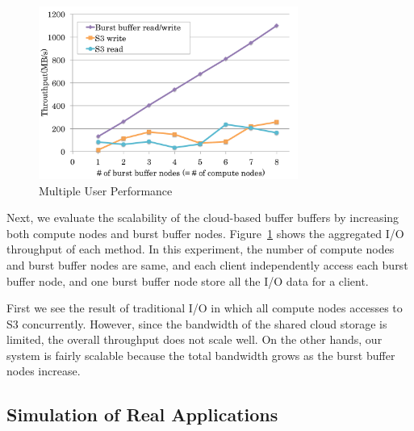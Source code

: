 \begin{figure}
\centering
\includegraphics[width=8.5cm]{img/multiple_client-2.pdf}
\caption{Multiple User Performance}
\label{evaluation:multiple user performance}
\end{figure}
Next, we evaluate the scalability of the
cloud-based buffer buffers by increasing both compute nodes and burst
buffer nodes.
Figure~\ref{evaluation:multiple user performance} shows the aggregated
I/O throughput of each method. In this experiment, the number of compute nodes
and burst buffer nodes are same, and each client independently
access each burst buffer node, and one burst buffer node store all the I/O
data for a client.

First we see the result of traditional I/O in which all compute nodes
accesses to S3 concurrently.
However, since the bandwidth of the shared cloud storage is limited, the
overall throughput does not scale well. On the other hands, our system is fairly
scalable because the total bandwidth grows as the burst buffer nodes increase.

\subsection{Simulation of Real Applications}


